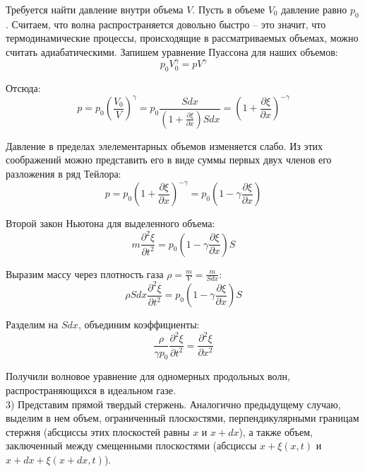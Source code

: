 \documentclass{article}
\begin{document}
	Требуется найти давление внутри объема $V$. Пусть в объеме $V_0$ давление равно $p_0$. Считаем, что волна распространяется довольно быстро -- это значит, что термодинамические процессы, происходящие в рассматриваемых объемах, можно считать адиабатическими. Запишем уравнение Пуассона для наших объемов:
	\begin{equation}
		p_0V_0^\gamma = pV^\gamma
	\end{equation}

	Отсюда:
	\begin{equation}
		p = p_0(\frac{V_0}{V})^\gamma = p_0\frac{Sdx}{(1+\frac{\partial \xi}{\partial x})Sdx} = (1+\frac{\partial \xi}{\partial x})^{-\gamma}
	\end{equation}

	Давление в пределах элелементарных объемов изменяется слабо. Из этих соображений можно представить его в виде суммы первых двух членов его разложения в ряд Тейлора:
	\begin{equation}
		p = p_0(1+\frac{\partial \xi}{\partial x})^{-\gamma} = p_0(1 - \gamma \frac{\partial \xi}{\partial x})
	\end{equation}

	Второй закон Ньютона для выделенного объема:
	\begin{equation}
		m\frac{\partial^2\xi}{\partial t^2} = p_0(1 - \gamma \frac{\partial \xi}{\partial x})S
	\end{equation}

	Выразим массу через плотность газа $\rho=\frac{m}{V}=\frac{m}{Sdx}$:
	\begin{equation}
		\rho Sdx \frac{\partial^2\xi}{\partial t^2} = p_0(1 - \gamma \frac{\partial \xi}{\partial x})S
	\end{equation}

	Разделим на $Sdx$, объединим коэффициенты:
	\begin{equation}
		\frac{\rho}{\gamma p_0} \frac{\partial^2\xi}{\partial t^2} = \frac{\partial^2 \xi}{\partial x^2}
	\end{equation}

	Получили волновое уравнение для одномерных продольных волн, распространяющихся в идеальном газе.\\

	3) Представим прямой твердый стержень. Аналогично предыдущему случаю, выделим в нем объем, ограниченный плоскостями, перпендикулярными границам стержня (абсциссы этих плоскостей равны $x$ и $x+dx$), а также объем, заключенный между смещенными плоскостями (абсциссы $x+\xi(x,t)$ и $x+dx+\xi(x+dx,t)$).\\
\end{document}
